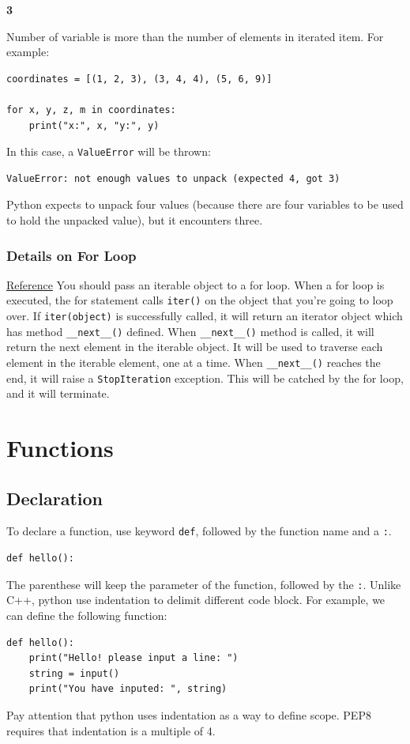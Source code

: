 \documentclass[12pt]{book}
\begin{document}
\textbf{3}

Number of variable is more than the number of elements in iterated item. For example:
\begin{verbatim}
coordinates = [(1, 2, 3), (3, 4, 4), (5, 6, 9)]

for x, y, z, m in coordinates:
    print("x:", x, "y:", y)
\end{verbatim}
In this case, a \texttt{ValueError} will be thrown:
\begin{verbatim}
ValueError: not enough values to unpack (expected 4, got 3)
\end{verbatim}
Python expects to unpack four values (because there are four variables to be used to hold the unpacked value), but it encounters three.
\subsection{Details on For Loop  \label{orgb89de93}}
\label{sec:org1f68b1b}
\href{https://www.geeksforgeeks.org/python-difference-iterable-iterator/}{Reference}
You should pass an iterable object to a for loop. When a for loop is executed, the for statement calls \texttt{iter()} on the object that you're going to loop over. If \texttt{iter(object)} is successfully called, it will return an iterator object which has method \texttt{\_\_next\_\_()} defined. When \texttt{\_\_next\_\_()} method is called, it will return the next element in the iterable object. It will be used to traverse each element in the iterable element, one at a time. When \texttt{\_\_next\_\_()} reaches the end, it will raise a \texttt{StopIteration} exception. This will be catched by the for loop, and it will terminate.

\chapter{Functions}
\label{sec:org3071745}
\section{Declaration}
\label{sec:org6099556}
To declare a function, use keyword \texttt{def}, followed by the function name and a \texttt{:}.
\begin{verbatim}
def hello():
\end{verbatim}
The parenthese will keep the parameter of the function, followed by the \texttt{:}. Unlike C++, python use indentation to delimit different code block. For example, we can define the following function:
\begin{verbatim}
def hello():
    print("Hello! please input a line: ")
    string = input()
    print("You have inputed: ", string)
\end{verbatim}
Pay attention that python uses indentation as a way to define scope. PEP8 requires that indentation is a multiple of 4.
\end{document}
